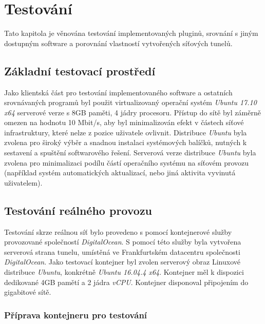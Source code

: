 \documentclass[thesis=M,czech]{FITthesis}[2012/10/20]
\begin{document}
    
    


\chapter{Testování}

Tato kapitola je věnována testování implementovaných pluginů, srovnání s jiným dostupným software a porovnání vlastností vytvořených síťových tunelů.

\section{Základní testovací prostředí}

Jako klientská část pro testování implementovaného software a ostatních srovnávaných programů byl použit virtualizovaný operační systém \textit{Ubuntu 17.10 x64} serverové verze s 8GB paměti, 4 jádry procesoru. Přístup do sítě byl záměrně omezen na hodnotu 10 Mbit/s, aby byl minimalizován efekt  v částech síťové infrastruktury, které nelze z pozice uživatele ovlivnit. Distribuce \textit{Ubuntu} byla zvolena pro široký výběr a snadnou instalaci systémových balíčků, nutných k sestavení a spuštění softwarového řešení. Serverová verze distribuce \textit{Ubuntu} byla zvolena pro minimalizaci podílu částí operačního systému na síťovém provozu (například systém automatických aktualizací, nebo jiná aktivita vyvinutá uživatelem).

\section{Testování reálného provozu}

Testování skrze reálnou síť bylo provedeno s pomocí kontejnerové služby provozované společností \textit{DigitalOcean}. S pomocí této služby byla vytvořena serverová strana tunelu, umístěná ve Frankfurtském datacentru společnosti \textit{\mbox{DigitalOcean}}. Jako testovací kontejner byl zvolen serverový obraz Linuxové distribuce \textit{Ubuntu}, konkrétně \textit{Ubuntu 16.04.4 x64}. Kontejner měl k dispozici dedikované 4GB pamětí a 2 jádra \textit{vCPU}. Kontejner disponoval připojením do gigabitové sítě.

\subsection{Příprava kontejneru pro testování}
\end{document}
